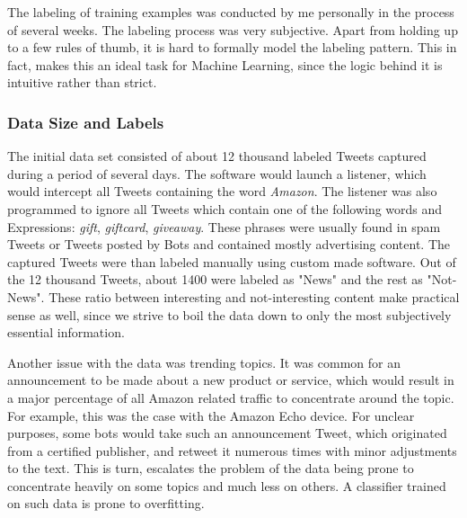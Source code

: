 		The labeling of training examples was conducted by me personally in the process of several weeks. The labeling process was very subjective. Apart from holding up to a few rules of thumb, it is hard to formally model the labeling pattern. This in fact, makes this an ideal task for Machine Learning, since the logic behind it is intuitive rather than strict.
		
		\subsubsection{Data Size and Labels}
			The initial data set consisted of about 12 thousand labeled Tweets captured during a period of several days. The software would launch a listener, which would intercept all Tweets containing the word \textit{Amazon}. The listener was also programmed to ignore all Tweets which contain one of the following words and Expressions: \textit{gift}, \textit{giftcard}, \textit{giveaway}. These phrases were usually found in spam Tweets or Tweets posted by Bots and contained mostly advertising content. The captured Tweets were than labeled manually using custom made software. Out of the 12 thousand Tweets, about 1400 were labeled as "News" and the rest as "Not-News". These ratio between interesting and not-interesting content make practical sense as well, since we strive to boil the data down to only the most subjectively essential information. 
			
			\par
			
			Another issue with the data was trending topics. It was common for an announcement to be made about a new product or service, which would result in a major percentage of all Amazon related traffic to concentrate around the topic. For example, this was the case with the Amazon Echo device. For unclear purposes, some bots would take such an announcement Tweet, which originated from a certified publisher, and retweet it numerous times with minor adjustments to the text. This is turn, escalates the problem of the data being prone to concentrate heavily on some topics and much less on others. A classifier trained on such data is prone to overfitting.
			
